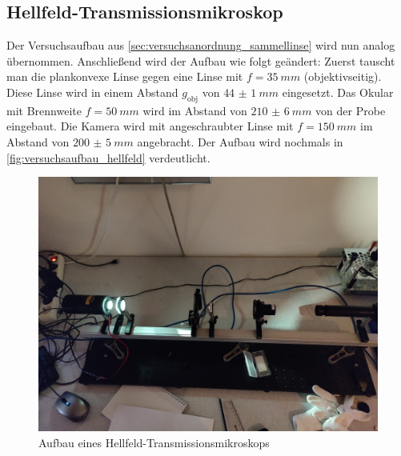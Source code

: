 \documentclass[ngerman]{scrartcl}
\begin{document}
\subsection{Hellfeld-Transmissionsmikroskop}
Der Versuchsaufbau aus \autoref{sec:versuchsanordnung_sammellinse} wird nun analog übernommen. Anschließend wird der Aufbau wie folgt geändert: Zuerst tauscht man die plankonvexe Linse gegen eine Linse mit $f = \SI{35}{mm}$ (objektivseitig). Diese Linse wird in einem Abstand $g_{\text{obj}}$ von $\SI{44(1)}{mm}$ eingesetzt. Das Okular mit Brennweite $f = \SI{50}{mm}$ wird im Abstand von $\SI{210(6)}{mm}$ von der Probe eingebaut. Die Kamera wird mit angeschraubter Linse mit $f = \SI{150}{mm}$ im Abstand von $\SI{200(5)}{mm}$ angebracht. %
Der Aufbau wird nochmals in \autoref{fig:versuchsaufbau_hellfeld} verdeutlicht. 
\begin{figure}[H]
    \centering
    \begin{samepage}
        \includegraphics[width=\linewidth]{fig/Hellfeld_.jpeg}
        \caption{Aufbau eines Hellfeld-Transmissionsmikroskops}
        \label{fig:versuchsaufbau_hellfeld}
    \end{samepage}
\end{figure}
%
\end{document}
